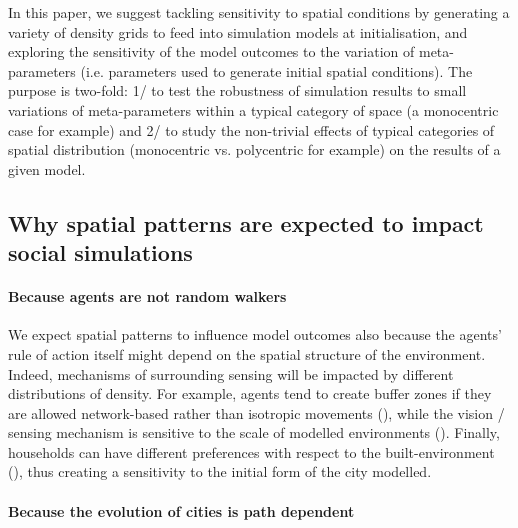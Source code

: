 \documentclass[Afour,sageh,times]{sagej}
\begin{document}
In this paper, we suggest tackling sensitivity to spatial conditions by generating a variety of density grids to feed into simulation models at initialisation, and exploring the sensitivity of the model outcomes to the variation of meta-parameters (i.e. parameters used to generate initial spatial conditions). The purpose is two-fold: 1/ to test the robustness of simulation results to small variations of meta-parameters within a typical category of space (a monocentric case for example) and 2/ to study the non-trivial effects of typical categories of spatial distribution (monocentric vs. polycentric for example) on the results of a given model.

\subsection{Why spatial patterns are expected to impact social simulations}

\paragraph{Because agents are not random walkers}

We expect spatial patterns to influence model outcomes also because the agents' rule of action itself might depend on the spatial structure of the environment. Indeed, mechanisms of surrounding sensing will be impacted by different distributions of density. For example, agents tend to create buffer zones if they are allowed network-based rather than isotropic movements (\cite{Banos2012}), while the vision / sensing mechanism is sensitive to the scale of modelled environments (\cite{LauriJaggi2003, FossettDietrich2009}). Finally, households can have different preferences with respect to the built-environment (\cite{SpielmanHarrison2014}), thus creating a sensitivity to the initial form of the city modelled.  

\paragraph{Because the evolution of cities is path dependent}
\end{document}
